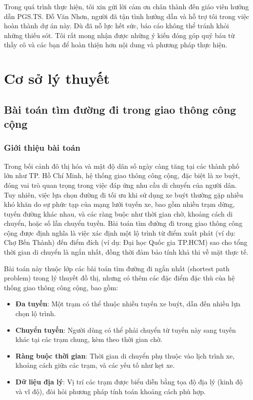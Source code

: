 \documentclass[a4paper,12pt]{article}
\begin{document}
Trong quá trình thực hiện, tôi xin gửi lời cảm ơn chân thành đến giáo viên hướng dẫn PGS.TS. Đỗ Văn Nhơn, người đã tận tình hướng dẫn và hỗ trợ tôi trong việc hoàn thành dự án này. Dù đã nỗ lực hết sức, báo cáo không thể tránh khỏi những thiếu sót. Tôi rất mong nhận được những ý kiến đóng góp quý báu từ thầy cô và các bạn để hoàn thiện hơn nội dung và phương pháp thực hiện.

\newpage
\tableofcontents

\newpage
\section{Cơ sở lý thuyết}

\subsection{Bài toán tìm đường đi trong giao thông công cộng}

\subsubsection{Giới thiệu bài toán}
Trong bối cảnh đô thị hóa và mật độ dân số ngày càng tăng tại các thành phố lớn như TP. Hồ Chí Minh, hệ thống giao thông công cộng, đặc biệt là xe buýt, đóng vai trò quan trọng trong việc đáp ứng nhu cầu di chuyển của người dân. Tuy nhiên, việc lựa chọn đường đi tối ưu khi sử dụng xe buýt thường gặp nhiều khó khăn do sự phức tạp của mạng lưới tuyến xe, bao gồm nhiều trạm dừng, tuyến đường khác nhau, và các ràng buộc như thời gian chờ, khoảng cách di chuyển, hoặc số lần chuyển tuyến. Bài toán tìm đường đi trong giao thông công cộng được định nghĩa là việc xác định một lộ trình từ điểm xuất phát (ví dụ: Chợ Bến Thành) đến điểm đích (ví dụ: Đại học Quốc gia TP.HCM) sao cho tổng thời gian di chuyển là ngắn nhất, đồng thời đảm bảo tính khả thi về mặt thực tế.

Bài toán này thuộc lớp các bài toán tìm đường đi ngắn nhất (shortest path problem) trong lý thuyết đồ thị, nhưng có thêm các đặc điểm đặc thù của hệ thống giao thông công cộng, bao gồm:

\begin{itemize}
    \item \textbf{Đa tuyến}: Một trạm có thể thuộc nhiều tuyến xe buýt, dẫn đến nhiều lựa chọn lộ trình.
    \item \textbf{Chuyển tuyến}: Người dùng có thể phải chuyển từ tuyến này sang tuyến khác tại các trạm chung, kèm theo thời gian chờ.
    \item \textbf{Ràng buộc thời gian}: Thời gian di chuyển phụ thuộc vào lịch trình xe, khoảng cách giữa các trạm, và các yếu tố như kẹt xe.
    \item \textbf{Dữ liệu địa lý}: Vị trí các trạm được biểu diễn bằng tọa độ địa lý (kinh độ và vĩ độ), đòi hỏi phương pháp tính toán khoảng cách phù hợp.
\end{itemize}
\end{document}
